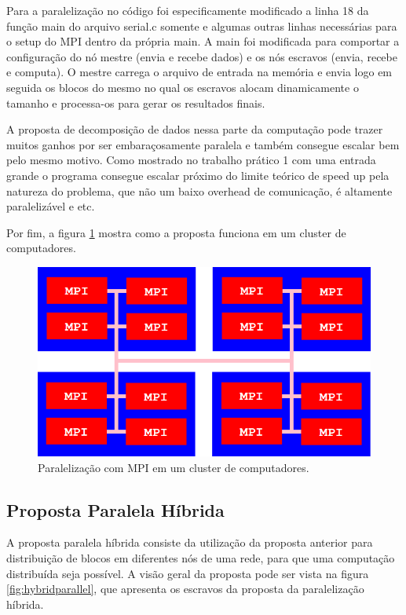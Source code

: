 \documentclass[12pt]{article}
\begin{document}
Para a paralelização no código foi especificamente modificado a linha 18 da função main do arquivo serial.c somente e algumas outras linhas necessárias para o setup do MPI dentro da própria main. A main foi modificada para comportar a configuração do nó mestre (envia e recebe dados) e os nós escravos (envia, recebe e computa). O mestre carrega o arquivo de entrada na memória e envia logo em seguida os blocos do mesmo no qual os escravos alocam dinamicamente o tamanho e processa-os para gerar os resultados finais.

A proposta de decomposição de dados nessa parte da computação pode trazer muitos ganhos por ser embaraçosamente paralela e também consegue escalar bem pelo mesmo motivo. Como mostrado no trabalho prático 1 com uma entrada grande o programa consegue escalar próximo do limite teórico de speed up pela natureza do problema, que não um baixo overhead de comunicação, é altamente paralelizável e etc.

Por fim, a figura \ref{fig:mpiparallel} mostra como a proposta funciona em um cluster de computadores.

\begin{figure}[H]
	\centering
	\includegraphics[width=0.7\linewidth]{./mpiparallel.png}
	\caption{Paralelização com MPI em um cluster de computadores.}
	\label{fig:mpiparallel}
\end{figure}


\subsection{Proposta Paralela Híbrida}

A proposta paralela híbrida consiste da utilização da proposta anterior para distribuição de blocos em diferentes nós de uma rede, para que uma computação distribuída seja possível. A visão geral da proposta pode ser vista na figura \ref{fig:hybridparallel}, que apresenta os escravos da proposta da paralelização híbrida.
\end{document}
